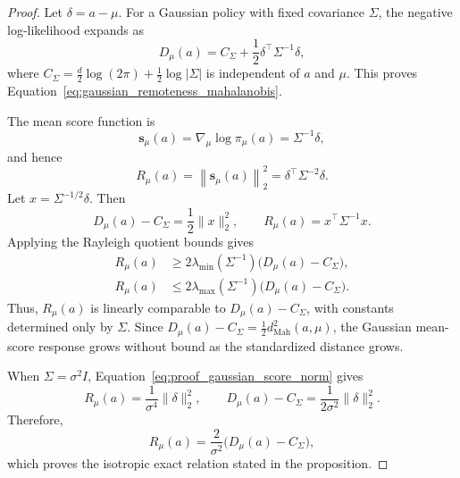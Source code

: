 \documentclass[sigconf,anonymous,review]{acmart}
\theoremstyle{acmdefinition}
\begin{document}
\begin{proof}
Let \(\delta=a-\mu\). For a Gaussian policy with fixed covariance
\(\Sigma\), the negative log-likelihood expands as
\[
    D_\mu(a)
    =
    C_\Sigma
    +
    \frac{1}{2}
    \delta^\top\Sigma^{-1}\delta,
\]
where
\(C_\Sigma=\frac{d}{2}\log(2\pi)+\frac{1}{2}\log|\Sigma|\)
is independent of \(a\) and \(\mu\). This proves
Equation~\eqref{eq:gaussian_remoteness_mahalanobis}.

The mean score function is
\begin{equation}
    \mathbf{s}_\mu(a)
    =
    \nabla_\mu\log\pi_\mu(a)
    =
    \Sigma^{-1}\delta,
\end{equation}
and hence
\begin{equation}
    R_\mu(a)
    =
    \left\|\mathbf{s}_\mu(a)\right\|_2^2
    =
    \delta^\top\Sigma^{-2}\delta.
    \label{eq:proof_gaussian_score_norm}
\end{equation}
Let \(x=\Sigma^{-1/2}\delta\). Then
\begin{equation}
    D_\mu(a)-C_\Sigma
    =
    \frac{1}{2}\|x\|_2^2,
    \qquad
    R_\mu(a)
    =
    x^\top\Sigma^{-1}x.
\end{equation}
Applying the Rayleigh quotient bounds gives
\begin{equation}
\begin{aligned}
    R_\mu(a)
    &\geq
    2\lambda_{\min}(\Sigma^{-1})
    \bigl(D_\mu(a)-C_\Sigma\bigr), \\
    R_\mu(a)
    &\leq
    2\lambda_{\max}(\Sigma^{-1})
    \bigl(D_\mu(a)-C_\Sigma\bigr).
\end{aligned}
\label{eq:proof_gaussian_score_remoteness_bounds}
\end{equation}
Thus, \(R_\mu(a)\) is linearly comparable to
\(D_\mu(a)-C_\Sigma\), with constants determined only by \(\Sigma\).
Since \(D_\mu(a)-C_\Sigma=\frac12 d_{\mathrm{Mah}}^2(a,\mu)\),
the Gaussian mean-score response grows without bound as the standardized
distance grows.

When \(\Sigma=\sigma^2I\), Equation~\eqref{eq:proof_gaussian_score_norm}
gives
\[
    R_\mu(a)
    =
    \frac{1}{\sigma^4}\|\delta\|_2^2,
    \qquad
    D_\mu(a)-C_\Sigma
    =
    \frac{1}{2\sigma^2}\|\delta\|_2^2.
\]
Therefore,
\[
    R_\mu(a)
    =
    \frac{2}{\sigma^2}
    \bigl(D_\mu(a)-C_\Sigma\bigr),
\]
which proves the isotropic exact relation stated in the proposition.


\end{proof}
\end{document}
